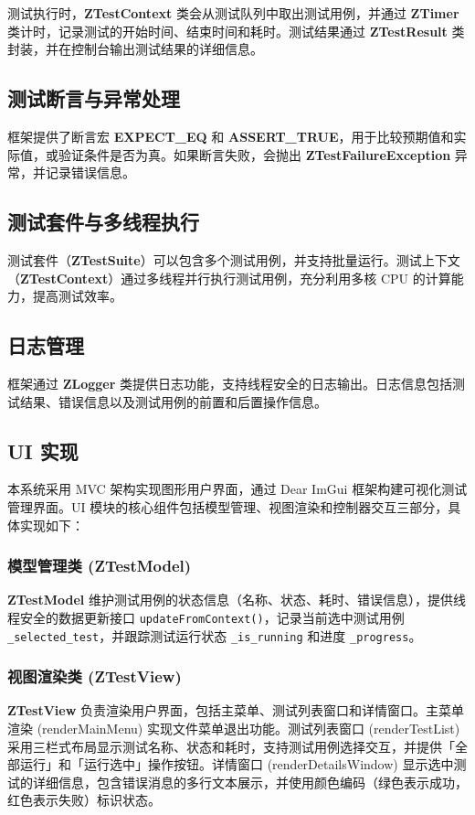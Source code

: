 \documentclass[chinese]{article}
\begin{document}
测试执行时，\textbf{ZTestContext} 类会从测试队列中取出测试用例，并通过 \textbf{ZTimer} 类计时，记录测试的开始时间、结束时间和耗时。测试结果通过 \textbf{ZTestResult} 类封装，并在控制台输出测试结果的详细信息。

\subsection{测试断言与异常处理}
框架提供了断言宏 \textbf{EXPECT\_EQ} 和 \textbf{ASSERT\_TRUE}，用于比较预期值和实际值，或验证条件是否为真。如果断言失败，会抛出 \textbf{ZTestFailureException} 异常，并记录错误信息。

\subsection{测试套件与多线程执行}
测试套件（\textbf{ZTestSuite}）可以包含多个测试用例，并支持批量运行。测试上下文（\textbf{ZTestContext}）通过多线程并行执行测试用例，充分利用多核 CPU 的计算能力，提高测试效率。

\subsection{日志管理}
框架通过 \textbf{ZLogger} 类提供日志功能，支持线程安全的日志输出。日志信息包括测试结果、错误信息以及测试用例的前置和后置操作信息。


\subsection{UI 实现}
本系统采用 MVC 架构实现图形用户界面，通过 Dear ImGui 框架构建可视化测试管理界面。UI 模块的核心组件包括模型管理、视图渲染和控制器交互三部分，具体实现如下：

\subsubsection{模型管理类 (\textbf{ZTestModel})}
\textbf{ZTestModel} 维护测试用例的状态信息（名称、状态、耗时、错误信息），提供线程安全的数据更新接口 \texttt{updateFromContext()}，记录当前选中测试用例 \texttt{\_selected\_test}，并跟踪测试运行状态 \texttt{\_is\_running} 和进度 \texttt{\_progress}。

\subsubsection{视图渲染类 (\textbf{ZTestView})}
\textbf{ZTestView} 负责渲染用户界面，包括主菜单、测试列表窗口和详情窗口。主菜单渲染 (renderMainMenu) 实现文件菜单退出功能。测试列表窗口 (renderTestList) 采用三栏式布局显示测试名称、状态和耗时，支持测试用例选择交互，并提供「全部运行」和「运行选中」操作按钮。详情窗口 (renderDetailsWindow) 显示选中测试的详细信息，包含错误消息的多行文本展示，并使用颜色编码（绿色表示成功，红色表示失败）标识状态。
\end{document}
